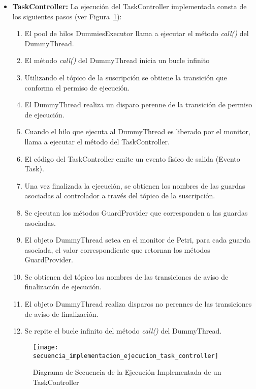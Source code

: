 \begin{itemize}
  \item \textbf{TaskController: } La ejecución del TaskController implementada
  consta de los siguientes pasos (ver
  Figura~\ref{fig:diagrama_secuencia_implementacion_ejecucion_task_controller}):
  	\begin{enumerate}
  	  \item El pool de hilos DummiesExecutor llama a ejecutar el método
  	  \emph{call()} del DummyThread.
  	  \item El método \emph{call()} del DummyThread inicia un bucle infinito
  	  \item Utilizando el tópico de la suscripción se obtiene la transición que
  	  conforma el permiso de ejecución.
  	  \item El DummyThread realiza un disparo perenne de la transición de permiso
  	  de ejecución.
  	  \item Cuando el hilo que ejecuta al DummyThread es liberado por el
  	  monitor, llama a ejecutar el método del TaskController.
  	  \item El código del TaskController emite un evento físico de salida
  	  (Evento Task).
  	  \item Una vez finalizada la ejecución, se obtienen los nombres de las guardas asociadas al
  	  controlador a través del tópico de la suscripción.
  	  \item Se ejecutan los métodos GuardProvider que corresponden a las guardas
  	  asociadas. 
  	  \item El objeto DummyThread setea en el monitor de Petri, para cada guarda asociada, el valor
  	  correspondiente que retornan los métodos GuardProvider.
  	  \item Se obtienen del tópico los nombres de las transiciones de aviso de
  	  finalización de ejecución.
  	  \item El objeto DummyThread realiza disparos no perennes de las
  	  transiciones de aviso de finalización.
  	  \item Se repite el bucle infinito del método \emph{call()} del DummyThread.
  	\end{enumerate}
  	
\begin{figure}[H]
	\hspace{-2,90cm}
	\texttt{[image: secuencia\_implementacion\_ejecucion\_task\_controller]}
	\caption{Diagrama de Secuencia de la Ejecución Implementada de un
	TaskController}
	\label{fig:diagrama_secuencia_implementacion_ejecucion_task_controller}
\end{figure}


\end{itemize}
